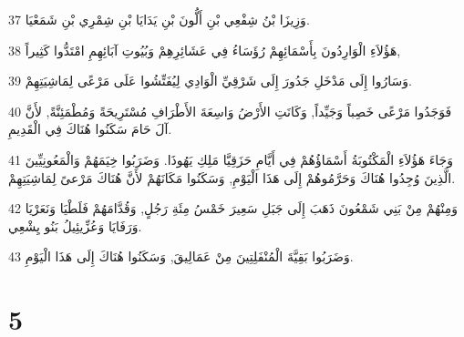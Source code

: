 \par 37 وَزِيزَا بْنُ شِفْعِي بْنِ أَلُّونَ بْنِ يَدَايَا بْنِ شِمْرِي بْنِ شَمَعْيَا.
\par 38 هَؤُلاَءِ الْوَارِدُونَ بِأَسْمَائِهِمْ رُؤَسَاءُ فِي عَشَائِرِهِمْ وَبُيُوتِ آبَائِهِمِ امْتَدُّوا كَثِيراً,
\par 39 وَسَارُوا إِلَى مَدْخَلِ جَدُورَ إِلَى شَرْقِيِّ الْوَادِي لِيُفَتِّشُوا عَلَى مَرْعًى لِمَاشِيَتِهِمْ.
\par 40 فَوَجَدُوا مَرْعًى خَصِباً وَجَيِّداً, وَكَانَتِ الأَرْضُ وَاسِعَةَ الأَطْرَافِ مُسْتَرِيحَةً وَمُطْمَئِنَّةً, لأَنَّ آلَ حَامَ سَكَنُوا هُنَاكَ فِي الْقَدِيمِ.
\par 41 وَجَاءَ هَؤُلاَءِ الْمَكْتُوبَةُ أَسْمَاؤُهُمْ فِي أَيَّامِ حَزَقِيَّا مَلِكِ يَهُوذَا. وَضَرَبُوا خِيَمَهُمْ وَالْمَعُونِيِّينَ الَّذِينَ وُجِدُوا هُنَاكَ وَحَرَّمُوهُمْ إِلَى هَذَا الْيَوْمِ, وَسَكَنُوا مَكَانَهُمْ لأَنَّ هُنَاكَ مَرْعىً لِمَاشِيَتِهِمْ.
\par 42 وَمِنْهُمْ مِنْ بَنِي شَمْعُونَ ذَهَبَ إِلَى جَبَلِ سَعِيرَ خَمْسُ مِئَةِ رَجُلٍ, وَقُدَّامَهُمْ فَلَطْيَا وَنَعَرْيَا وَرَفَايَا وَعُزِّيئِيلُ بَنُو يِشْعِي.
\par 43 وَضَرَبُوا بَقِيَّةَ الْمُنْفَلِتِينَ مِنْ عَمَالِيقَ, وَسَكَنُوا هُنَاكَ إِلَى هَذَا الْيَوْمِ.

\chapter{5}

